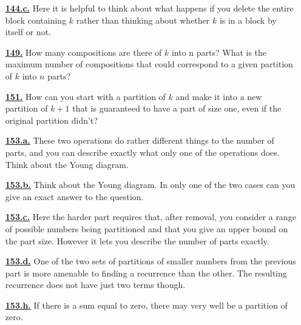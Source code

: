 \documentclass[10pt,]{book}
\theoremstyle{plain}
\theoremstyle{definition}
\theoremstyle{definition}
\theoremstyle{definition}
\numberwithin{equation}{chapter}
\begin{document}
\begin{itemize}[itemsep=1em]
\hypertarget{a-144.c}{}\item[\textbf{\hyperref[task-146]{144.c.}}]
\hypertarget{p-697}{}%
Here it is helpful to think about what happens if you delete the entire block containing \(k\) rather than thinking about whether \(k\) is in a block by itself or not.%

\hypertarget{a-149}{}\item[\textbf{\hyperref[activity-149]{149.}}]
\hypertarget{p-715}{}%
How many compositions are there of \(k\) into n parts? What is the maximum number of compositions that could correspond to a given partition of \(k\) into \(n\) parts?%

\hypertarget{a-151}{}\item[\textbf{\hyperref[activity-151]{151.}}]
\hypertarget{p-720}{}%
How can you start with a partition of \(k\) and make it into a new partition of \(k+1\) that is guaranteed to have a part of size one, even if the original partition didn't?%

\hypertarget{a-153.a}{}\item[\textbf{\hyperref[task-148]{153.a.}}]
\hypertarget{p-728}{}%
These two operations do rather different things to the number of parts, and you can describe exactly what only one of the operations does. Think about the Young diagram.%

\hypertarget{a-153.b}{}\item[\textbf{\hyperref[task-149]{153.b.}}]
\hypertarget{p-731}{}%
Think about the Young diagram. In only one of the two cases can you give an exact answer to the question.%

\hypertarget{a-153.c}{}\item[\textbf{\hyperref[task-150]{153.c.}}]
\hypertarget{p-734}{}%
Here the harder part requires that, after removal, you consider a range of possible numbers being partitioned and that you give an upper bound on the part size. However it lets you describe the number of parts exactly.%

\hypertarget{a-153.d}{}\item[\textbf{\hyperref[task-151]{153.d.}}]
\hypertarget{p-738}{}%
One of the two sets of partitions of smaller numbers from the previous part is more amenable to finding a recurrence than the other. The resulting recurrence does not have just two terms though.%

\hypertarget{a-153.h}{}\item[\textbf{\hyperref[task-155]{153.h.}}]
\hypertarget{p-746}{}%
If there is a sum equal to zero, there may very well be a partition of zero.%


\end{itemize}
\end{document}
